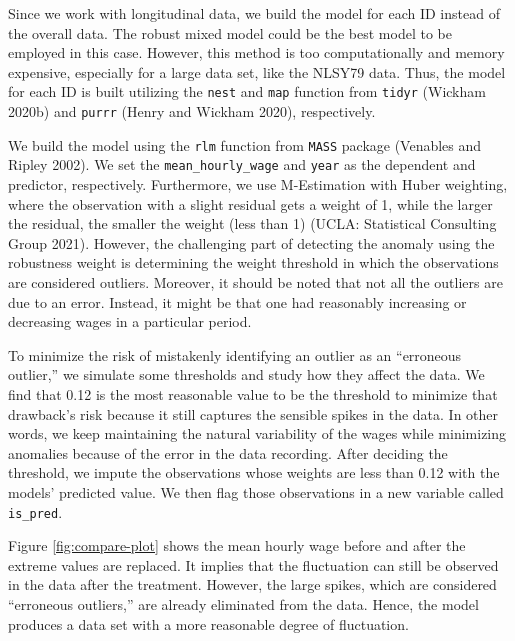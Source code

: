 \documentclass[12pt]{article}
\begin{document}
Since we work with longitudinal data, we build the model for each ID instead of the overall data. The robust mixed model could be the best model to be employed in this case. However, this method is too computationally and memory expensive, especially for a large data set, like the NLSY79 data. Thus, the model for each ID is built utilizing the \texttt{nest} and \texttt{map} function from \texttt{tidyr} (Wickham 2020b) and \texttt{purrr} (Henry and Wickham 2020), respectively.

We build the model using the \texttt{rlm} function from \texttt{MASS} package (Venables and Ripley 2002). We set the \texttt{mean\_hourly\_wage} and \texttt{year} as the dependent and predictor, respectively. Furthermore, we use M-Estimation with Huber weighting, where the observation with a slight residual gets a weight of 1, while the larger the residual, the smaller the weight (less than 1) (UCLA: Statistical Consulting Group 2021). However, the challenging part of detecting the anomaly using the robustness weight is determining the weight threshold in which the observations are considered outliers. Moreover, it should be noted that not all the outliers are due to an error. Instead, it might be that one had reasonably increasing or decreasing wages in a particular period.

To minimize the risk of mistakenly identifying an outlier as an ``erroneous outlier,'' we simulate some thresholds and study how they affect the data. We find that 0.12 is the most reasonable value to be the threshold to minimize that drawback's risk because it still captures the sensible spikes in the data. In other words, we keep maintaining the natural variability of the wages while minimizing anomalies because of the error in the data recording. After deciding the threshold, we impute the observations whose weights are less than 0.12 with the models' predicted value. We then flag those observations in a new variable called \texttt{is\_pred}.

Figure \ref{fig:compare-plot} shows the mean hourly wage before and after the extreme values are replaced. It implies that the fluctuation can still be observed in the data after the treatment. However, the large spikes, which are considered ``erroneous outliers,'' are already eliminated from the data. Hence, the model produces a data set with a more reasonable degree of fluctuation.
\end{document}
